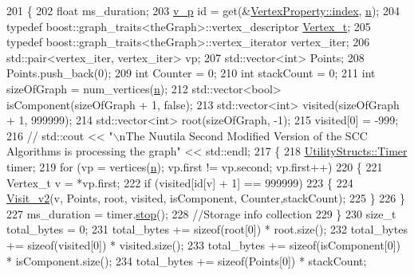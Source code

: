 \begin{DoxyCode}
201 \{
202     \textcolor{keywordtype}{float} ms\_duration;
203     \hyperlink{utilities_8h_a3f4959b3d837fa6351a9414c79280286}{v\_p} \textcolor{keywordtype}{id} = \textcolor{keyword}{get}(&\hyperlink{struct_utility_structs_1_1_vertex_property_a636cb729438e999aa3d9a17ac39d8641}{VertexProperty::index}, \hyperlink{class_nuutila_a1409929fa0f38709497f8bdb012af71c}{n});
204     \textcolor{keyword}{typedef} boost::graph\_traits<theGraph>::vertex\_descriptor \hyperlink{class_graph_component_ae67114a6ce5a001dc35e1996e1b45aa0}{Vertex\_t};
205     \textcolor{keyword}{typedef} boost::graph\_traits<theGraph>::vertex\_iterator vertex\_iter;
206     std::pair<vertex\_iter, vertex\_iter> vp;
207     std::vector<int> Points;
208     Points.push\_back(0);
209     \textcolor{keywordtype}{int} Counter = 0;
210     \textcolor{keywordtype}{int} stackCount = 0;
211     \textcolor{keywordtype}{int} sizeOfGraph = num\_vertices(\hyperlink{class_nuutila_a1409929fa0f38709497f8bdb012af71c}{n});
212     std::vector<bool> isComponent(sizeOfGraph + 1, \textcolor{keyword}{false});
213     std::vector<int> visited(sizeOfGraph + 1, 999999);
214     std::vector<int> root(sizeOfGraph, -1);
215     visited[0] = -999;
216     \textcolor{comment}{//   std::cout << "\(\backslash\)nThe Nuutila Second Modified Version of the SCC Algorithms is processing the graph"
       << std::endl;}
217     \{
218         \hyperlink{class_utility_structs_1_1_timer}{UtilityStructs::Timer} timer;
219         \textcolor{keywordflow}{for} (vp = vertices(\hyperlink{class_nuutila_a1409929fa0f38709497f8bdb012af71c}{n}); vp.first != vp.second; vp.first++)
220         \{
221             Vertex\_t v = *vp.first;
222             \textcolor{keywordflow}{if} (visited[\textcolor{keywordtype}{id}[v] + 1] == 999999)
223             \{
224                 \hyperlink{class_nuutila_afc7a8c27d8de17ac2679f839ff8c2749}{Visit\_v2}(v, Points, root, visited, isComponent, Counter,stackCount);
225             \}
226         \}
227         ms\_duration = timer.\hyperlink{class_utility_structs_1_1_timer_a12f62b57c263d563efd6089cff52355f}{stop}();
228         \textcolor{comment}{//Storage info collection}
229     \}
230     \textcolor{keywordtype}{size\_t} total\_bytes = 0;
231     total\_bytes += \textcolor{keyword}{sizeof}(root[0]) * root.size();
232     total\_bytes += \textcolor{keyword}{sizeof}(visited[0]) * visited.size();
233     total\_bytes += \textcolor{keyword}{sizeof}(isComponent[0]) * isComponent.size();
234     total\_bytes += \textcolor{keyword}{sizeof}(Points[0]) * stackCount;

\end{DoxyCode}
